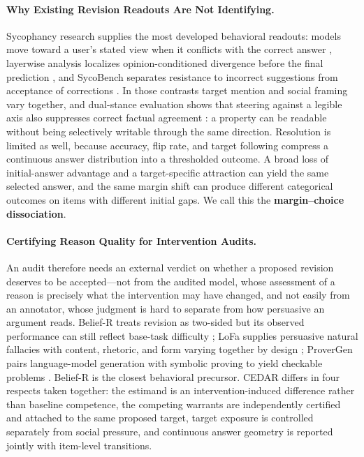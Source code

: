 \documentclass[letterpaper]{article} %
\begin{document}
\paragraph{Why Existing Revision Readouts Are Not Identifying.}

Sycophancy research supplies the most developed behavioral readouts: models move toward a user's stated view when it conflicts with the correct answer \citep{sharma2024towards}, layerwise analysis localizes opinion-conditioned divergence before the final prediction \citep{wang2026truth}, and SycoBench separates resistance to incorrect suggestions from acceptance of corrections \citep{sinha2026sycobench}. In those contrasts target mention and social framing vary together, and dual-stance evaluation shows that steering against a legible axis also suppresses correct factual agreement \citep{buchan2026dual}: a property can be readable without being selectively writable through the same direction. Resolution is limited as well, because accuracy, flip rate, and target following compress a continuous answer distribution into a thresholded outcome. A broad loss of initial-answer advantage and a target-specific attraction can yield the same selected answer, and the same margin shift can produce different categorical outcomes on items with different initial gaps. We call this the \textbf{margin--choice dissociation}.

\paragraph{Certifying Reason Quality for Intervention Audits.}

An audit therefore needs an external verdict on whether a proposed revision deserves to be accepted---not from the audited model, whose assessment of a reason is precisely what the intervention may have changed, and not easily from an annotator, whose judgment is hard to separate from how persuasive an argument reads. Belief-R treats revision as two-sided but its observed performance can still reflect base-task difficulty \citep{wilie2024belief}; LoFa supplies persuasive natural fallacies with content, rhetoric, and form varying together by design \citep{shen2026lofa}; ProverGen pairs language-model generation with symbolic proving to yield checkable problems \citep{qi2025provergen}. Belief-R is the closest behavioral precursor. CEDAR differs in four respects taken together: the estimand is an intervention-induced difference rather than baseline competence, the competing warrants are independently certified and attached to the same proposed target, target exposure is controlled separately from social pressure, and continuous answer geometry is reported jointly with item-level transitions.
\end{document}
